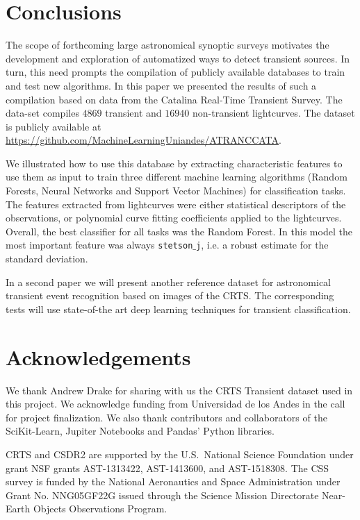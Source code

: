 \documentclass[usenatbib]{mnras}
\begin{document}
\section{Conclusions}
\label{sec:conclusions}

The scope of forthcoming large astronomical synoptic surveys 
motivates the development and exploration of automatized ways to
detect transient sources. 
In turn, this need prompts the compilation of publicly available databases
to train and test new algorithms. 
In this paper we presented the results of such a compilation based on data
from the Catalina Real-Time Transient Survey.
The data-set compiles  $4869$ transient and $16940$ non-transient
lightcurves. 
The dataset is publicly available at
\url{https://github.com/MachineLearningUniandes/ATRANCCATA}.   

We illustrated how to use this database by extracting 
characteristic features to use them as input to train three different
machine learning algorithms (Random Forests, Neural Networks and
Support Vector Machines) for classification tasks.
The features extracted from lightcurves were either statistical
descriptors of the observations, or polynomial curve fitting
coefficients applied to the lightcurves.   
Overall, the best classifier for all tasks was the Random Forest.
In this model the most important feature was always
\texttt{stetson$\_$j}, i.e. a robust estimate for the standard
deviation. 

In a second paper we will present another reference dataset for
astronomical transient event recognition based on images of the
CRTS.
The corresponding tests will use  state-of-the art deep learning
techniques for transient classification. 

\section*{Acknowledgements}

We thank Andrew Drake for sharing with us the CRTS Transient dataset
used in this project.  
We acknowledge funding from Universidad de los Andes in the call for
project finalization.
We also thank contributors and collaborators of the SciKit-Learn,
Jupiter Notebooks and Pandas' Python libraries.  

CRTS and CSDR2 are supported by the U.S.~National Science 
Foundation under grant NSF grants AST-1313422, AST-1413600, and 
AST-1518308.  The CSS survey is funded by the National Aeronautics
and Space Administration under Grant No. NNG05GF22G issued through
the Science Mission Directorate Near-Earth Objects Observations Program.



\end{document}
